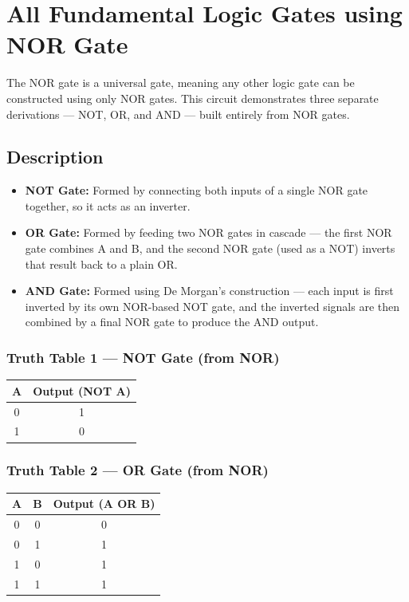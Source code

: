 \documentclass[12pt]{article}
\begin{document}
\section{All Fundamental Logic Gates using NOR Gate}

The NOR gate is a universal gate, meaning any other logic gate can be constructed using only NOR gates. This circuit demonstrates three separate derivations --- NOT, OR, and AND --- built entirely from NOR gates.

\subsection*{Description}
\begin{itemize}[leftmargin=*]
    \item \textbf{NOT Gate:} Formed by connecting both inputs of a single NOR gate together, so it acts as an inverter.
    \item \textbf{OR Gate:} Formed by feeding two NOR gates in cascade --- the first NOR gate combines A and B, and the second NOR gate (used as a NOT) inverts that result back to a plain OR.
    \item \textbf{AND Gate:} Formed using De Morgan's construction --- each input is first inverted by its own NOR-based NOT gate, and the inverted signals are then combined by a final NOR gate to produce the AND output.
\end{itemize}

\subsubsection*{Truth Table 1 --- NOT Gate (from NOR)}
\begin{table}[H]
\centering
\begin{tabular}{cc}
\toprule
A & Output (NOT A) \\
\midrule
0 & 1 \\
1 & 0 \\
\bottomrule
\end{tabular}
\end{table}

\subsubsection*{Truth Table 2 --- OR Gate (from NOR)}
\begin{table}[H]
\centering
\begin{tabular}{ccc}
\toprule
A & B & Output (A OR B) \\
\midrule
0 & 0 & 0 \\
0 & 1 & 1 \\
1 & 0 & 1 \\
1 & 1 & 1 \\
\bottomrule
\end{tabular}
\end{table}
\end{document}
